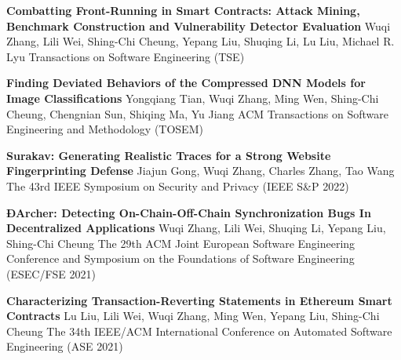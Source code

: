 \begin{scholarship}
	{\textbf{Combatting Front-Running in Smart Contracts: Attack Mining, Benchmark Construction and Vulnerability Detector Evaluation}}
	{Wuqi Zhang, Lili Wei, Shing-Chi Cheung, Yepang Liu, Shuqing Li, Lu Liu, Michael R. Lyu}
	\scholarshipentry{}
	{Transactions on Software Engineering (TSE)}

	{\textbf{Finding Deviated Behaviors of the Compressed DNN Models for Image Classifications}}
	{Yongqiang Tian, Wuqi Zhang, Ming Wen, Shing-Chi Cheung, Chengnian Sun, Shiqing Ma, Yu Jiang}
	\scholarshipentry{}
	{ACM Transactions on Software Engineering and Methodology (TOSEM)}

	{\textbf{Surakav: Generating Realistic Traces for a Strong Website Fingerprinting Defense}}
	{Jiajun Gong, Wuqi Zhang, Charles Zhang, Tao Wang}
	\scholarshipentry{}
	{The 43rd IEEE Symposium on Security and Privacy (IEEE S\&P 2022)}

	{\textbf{ÐArcher: Detecting On-Chain-Off-Chain Synchronization Bugs In Decentralized Applications}}
	{Wuqi Zhang, Lili Wei, Shuqing Li, Yepang Liu, Shing-Chi Cheung}
	\scholarshipentry{}
	{The 29th ACM Joint European Software Engineering Conference and Symposium on the Foundations of Software Engineering (ESEC/FSE 2021)}

	{\textbf{Characterizing Transaction-Reverting Statements in Ethereum Smart Contracts}}
	{Lu Liu, Lili Wei, Wuqi Zhang, Ming Wen, Yepang Liu, Shing-Chi Cheung}
	\scholarshipentry{}
	{The 34th IEEE/ACM International Conference on Automated Software Engineering (ASE 2021)}
\end{scholarship}
